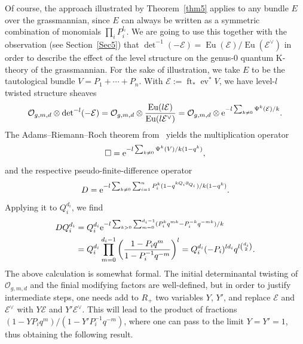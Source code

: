 \documentclass[10pt,a4paper]{amsart}
\numberwithin{equation}{section}
\def\E{\mathcal E}
\def\O{\mathcal O}
\def\det{\operatorname{det}}
\def\p{\partial}
\def\ev{\operatorname{ev}}
\def\ft{\operatorname{ft}}
\def\Eu{\operatorname{Eu}}
\def\square{\Box}
\theoremstyle{definition}
\theoremstyle{plain}
\begin{document}
Of course, the approach illustrated by Theorem~\ref{thm5} applies to any bundle $E$ over the grassmannian, since $E$ can always be written as a symmetric combination of monomials $\prod_i P_i^{l_i}$. We are going to use this together with the observation (see Section~\ref{Sec5}) that $\det^{-1}(-\E) =\Eu (\E)/\Eu (\E^{\vee})$ in order to describe the effect of the level structure on the genus-0 quantum K-theory of the grassmannian. For the sake of illustration, we take $E$ to be the tautological bundle $V=P_1+\cdots+P_n$. With $\E:=\ft_*\ev^*V$, we have level-$l$ twisted structure sheaves
\[
\O_{g,m,d}\otimes \det^{-l}(-\E) = \O_{g,m,d}\otimes \frac{\Eu(l \E)}{\Eu(l \E^{\vee})} = \O_{g,m,d}\otimes {\rm e}^{-l \sum_{k\neq 0} \Psi^k(\E)/k}.
\]
The Adams--Riemann--Roch theorem from~\cite{Givental:perm11} yields the multiplication operator
\[
\square = {\rm e}^{ -l \sum_{k\neq 0}\Psi^k(V)/k(1-q^k)},
\]
and the respective pseudo-finite-difference operator
\[
D={\rm e}^{ -l \sum_{k\neq 0}\sum_{i=1}^n P^k_i(1-q^{kQ_i\p_{Q_i}})/k(1-q^k)}.
\]
Applying it to $Q_i^{d_i}$, we find
\begin{align*}
D Q_i^{d_i} &= Q_i^{d_i}{\rm e}^{ -l\sum_{k>0}\sum_{m=0}^{d_i-1}(P_i^kq^{mk}-P_i^{-k}q^{-mk})/k}\\
 & = Q_i^{d_i}\prod_{m=0}^{d_i-1}\left(\frac{1-P_iq^m}{1-P_i^{-1}q^{-m}}\right)^l = Q_i^{d_i}(-P_i)^{ld_i}q^{l\binom{d_i}{2}}.
\end{align*}
The above calculation is somewhat formal. The initial determinantal twisting of $\O_{g,m,d}$ and the finial modifying factors are well-defined, but in order to justify intermediate steps, one needs add to $R_{+}$ two variables $Y$, $Y'$, and replace $\E$ and $\E^{\vee}$ with $Y\E$ and $Y'\E^{\vee}$. This will lead to the product of fractions $(1-YP_iq^m)/(1-Y'P_i^{-1}q^{-m})$, where one can pass to the limit $Y=Y'=1$, thus obtaining the following result.
\end{document}
